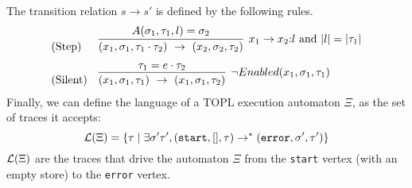 \documentclass{sigplanconf}[10pt] %
\begin{document}
%
The transition relation $s \to s'$ is defined by the following rules.
\[
\begin{array}{ll}
\text{(Step)}  &
\infer[x_1 \to x_2{:} l \mbox{ and } |l|=|\tau_1| ]{ (x_1,\sigma_1,\tau_1 \cdot \tau_2 ) \  \to \  (x_2, \sigma_2, \tau_2)}{A(\sigma_1,\tau_1,l)=\sigma_2}
\\[2ex]
\text{(Silent)}  & 
\infer[\neg Enabled(x_1,\sigma_1,\tau_1) ]{ (x_1,\sigma_1,\tau_1) \  \to \  (x_1, \sigma_1, \tau_2)}{ \tau_1=e \cdot \tau_2}
\end{array}
\]
Finally, we can define the language of a TOPL execution automaton $\Xi$, as the set of traces it accepts:
\[
{\cal L}(\Xi) = \{ \tau \mid \exists \sigma' \tau', (\mathtt{start},[],\tau) \to^* (\mathtt{error},\sigma',\tau')\}
\]
${\cal L}(\Xi)$ are the traces that drive the automaton $\Xi$ from the \texttt{start} vertex (with an empty store) to the \texttt{error} vertex.
\end{document}
